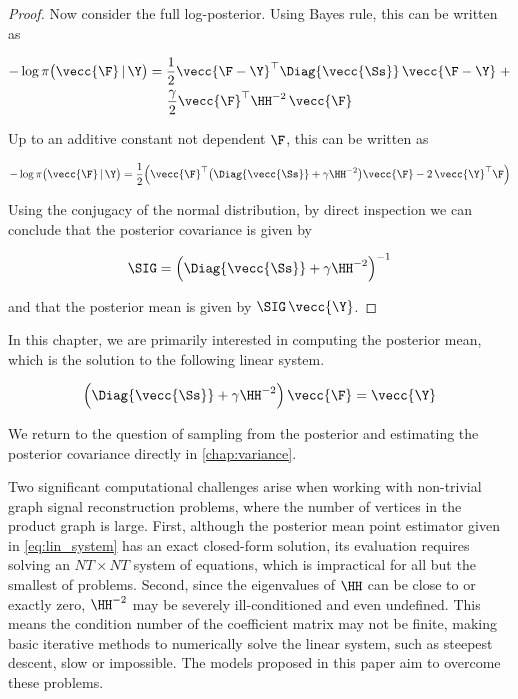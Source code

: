 \begin{proof}
    Now consider the full log-posterior. Using Bayes rule, this can be written as 

    \begin{multline}
        -\log \pi\big(\vecc{\F} \, | \, \Y \big) = \frac{1}{2} \vecc{\F - \Y}^\top \Diag{\vecc{\Ss}} \, \vecc{\F - \Y} \; + \\ \frac{\gamma}{2} \vecc{\F }^\top\HH^{-2} \, \vecc{\F}
    \end{multline}

    Up to an additive constant not dependent $\F$, this can be written as 

    \begin{equation}
        -\log \pi\big(\vecc{\F} \, | \, \Y \big) = \frac{1}{2} \Big( \vecc{\F}^\top \big( \Diag{\vecc{\Ss}} + \gamma \HH^{-2}\big) \vecc{\F} - 2 \, \vecc{\Y}^\top \F \Big)
    \end{equation}

    Using the conjugacy of the normal distribution, by direct inspection we can conclude that the posterior covariance is given by 

    \begin{equation}
        \SIG = \Big( \Diag{\vecc{\Ss}} + \gamma \HH^{-2} \Big)^{-1}
    \end{equation}

    and that the posterior mean is given by $\SIG \, \vecc{\Y}$. 

\end{proof}

In this chapter, we are primarily interested in computing the posterior mean, which is the solution to the following linear system. 

\begin{equation}
    \label{eq:lin_system}
        \Big(\Diag{\vecc{\Ss}} + \gamma  \HH^{-2}\Big) \, \vecc{\F} = \vecc{\Y}
    \end{equation}

We return to the question of sampling from the posterior and estimating the posterior covariance directly in \cref{chap:variance}. 

Two significant computational challenges arise when working with non-trivial graph signal reconstruction problems, where the number of vertices in the product graph is large. First, although the posterior mean point estimator given in \cref{eq:lin_system} has an exact closed-form solution, its evaluation requires solving an $NT \times NT$ system of equations, which is impractical for all but the smallest of problems. Second, since the eigenvalues of $\HH$ can be close to or exactly zero, $\HH^{-2}$ may be severely ill-conditioned and even undefined. This means the condition number of the coefficient matrix may not be finite, making basic iterative methods to numerically solve the linear system, such as steepest descent, slow or impossible. The models proposed in this paper aim to overcome these problems.


